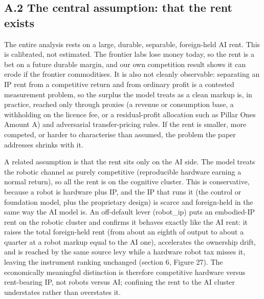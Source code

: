 \documentclass[12pt]{article}
\begin{document}
\hypertarget{a.2-the-central-assumption-that-the-rent-exists}{%
\subsection{A.2 The central assumption: that the rent
exists}\label{a.2-the-central-assumption-that-the-rent-exists}}

The entire analysis rests on a large, durable, separable, foreign-held
AI rent. This is calibrated, not estimated. The frontier labs lose money
today, so the rent is a bet on a future durable margin, and our own
competition result shows it can erode if the frontier commoditises. It
is also not cleanly observable: separating an IP rent from a competitive
return and from ordinary profit is a contested measurement problem, so
the surplus the model treats as a clean markup is, in practice, reached
only through proxies (a revenue or consumption base, a withholding on
the licence fee, or a residual-profit allocation such as Pillar
One\textquotesingle s Amount A) and adversarial transfer-pricing rules.
If the rent is smaller, more competed, or harder to characterise than
assumed, the problem the paper addresses shrinks with it.

A related assumption is that the rent sits only on the AI side. The
model treats the robotic channel as purely competitive (reproducible
hardware earning a normal return), so all the rent is on the cognitive
cluster. This is conservative, because a robot is hardware plus IP, and
the IP that runs it (the control or foundation model, plus the
proprietary design) is scarce and foreign-held in the same way the AI
model is. An off-default lever (robot\_ip) puts an embodied-IP rent on
the robotic cluster and confirms it behaves exactly like the AI rent: it
raises the total foreign-held rent (from about an eighth of output to
about a quarter at a robot markup equal to the AI one), accelerates the
ownership drift, and is reached by the same source levy while a hardware
robot tax misses it, leaving the instrument ranking unchanged (section
6, Figure 27). The economically meaningful distinction is therefore
competitive hardware versus rent-bearing IP, not robots versus AI;
confining the rent to the AI cluster understates rather than overstates
it.
\end{document}
